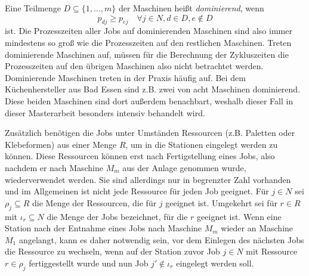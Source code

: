 \documentclass{scrreprt}
\begin{document}
Eine Teilmenge $D \subseteq \{1,\ldots,m\}$ der Maschinen heißt \textit{dominierend}, wenn 
\[ p_{dj} \geq p_{ej} \quad \forall j\in N, d\in D, e\not\in D \] 
ist. 
Die Prozesszeiten aller Jobs auf dominierenden Maschinen sind also immer mindestens so groß wie die Prozesszeiten auf den restlichen Maschinen.
Treten dominierende Maschinen auf, müssen für die Berechnung der Zykluszeiten die Prozesszeiten auf den übrigen Maschinen also nicht betrachtet werden.
Dominierende Maschinen treten in der Praxis häufig auf. 
Bei dem Küchenhersteller aus Bad Essen sind z.B. zwei von acht Maschinen dominierend.
Diese beiden Maschinen sind dort außerdem benachbart, weshalb dieser Fall in dieser Masterarbeit besonders intensiv behandelt wird. 

Zusätzlich benötigen die Jobs unter Umständen Ressourcen (z.B. Paletten oder Klebeformen) aus einer Menge $R$, 
um in die Stationen eingelegt werden zu können. Diese Ressourcen können erst nach
Fertigstellung eines Jobs, also nachdem er nach Maschine $M_m$ aus der Anlage genommen wurde, wiederverwendet werden.
Sie sind allerdings nur in begrenzter Zahl vorhanden und im Allgemeinen ist nicht jede Ressource für jeden Job geeignet.
Für $j\in N$ sei $\rho_j\subseteq R$ die Menge der Ressourcen, die für $j$ geeignet ist.
Umgekehrt sei für $r\in R$ mit $\iota_r\subseteq N$ die Menge der Jobs bezeichnet, für die $r$ geeignet ist.
Wenn eine Station nach der Entnahme eines Jobs nach Maschine $M_m$ wieder an Maschine $M_1$ angelangt, kann es daher notwendig sein, 
vor dem Einlegen des nächsten Jobs die Ressource zu wechseln, 
wenn auf der Station zuvor Job $j\in N$ mit Ressource $r\in\rho_j$ fertiggestellt wurde 
und nun Job $j'\not\in\iota_r$ eingelegt werden soll.
\end{document}
